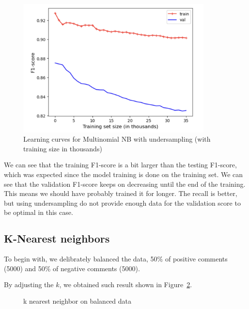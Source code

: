 \documentclass{article}
\begin{document}
\begin{figure}[H]
  \centering
  \includegraphics[height=7cm]{nb_start_learning_curves.png}
  \caption{Learning curves for Multinomial NB with undersampling (with training size in thousands)}
  \label{fig:image_label}
\end{figure}

We can see that the training F1-score is a bit larger than the testing F1-score, which was expected since the model training is done on the training set. We can see that the validation F1-score keeps on decreasing until the end of the training. This means we should have probably trained it for longer. The recall is better, but using undersampling do not provide enough data for the validation score to be optimal in this case.

\subsection{K-Nearest neighbors}

To begin with, we delibrately balanced the data, 50\% of positive comments (5000)
and 50\% of negative comments (5000).

By adjusting the $k$, we obtained such result shown in Figure~\ref{fig:KNN1}.

\begin{figure}[H]
  \centering
  \caption{k nearest neighbor on balanced data}
  \label{fig:KNN1}
\end{figure}
\end{document}

